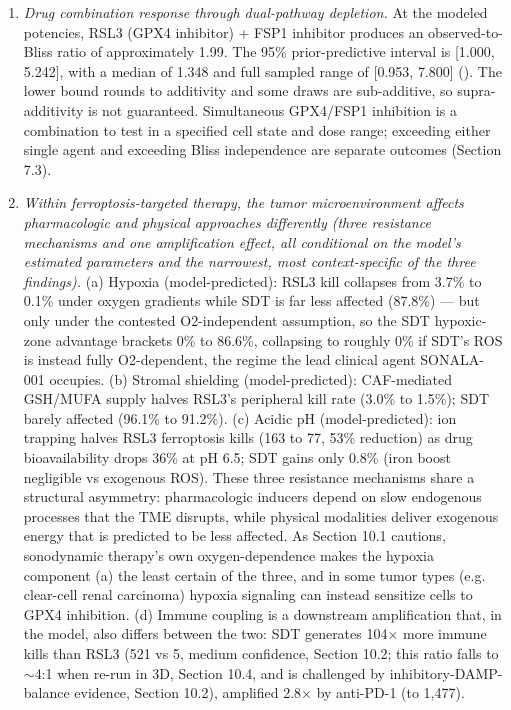 \documentclass[11pt,twoside,openright]{report}
\begin{document}
\begin{enumerate}
\item \textit{Drug combination response through dual-pathway depletion.} At the modeled potencies, RSL3 (GPX4 inhibitor) + FSP1 inhibitor produces an observed-to-Bliss ratio of approximately 1.99. The 95\% prior-predictive interval is [1.000, 5.242], with a median of 1.348 and full sampled range of [0.953, 7.800] (). The lower bound rounds to additivity and some draws are sub-additive, so supra-additivity is not guaranteed. Simultaneous GPX4/FSP1 inhibition is a combination to test in a specified cell state and dose range; exceeding either single agent and exceeding Bliss independence are separate outcomes (Section 7.3).
\item \textit{Within ferroptosis-targeted therapy, the tumor microenvironment affects pharmacologic and physical approaches differently (three resistance mechanisms and one amplification effect, all conditional on the model's estimated parameters and the narrowest, most context-specific of the three findings).} (a) Hypoxia (model-predicted): RSL3 kill collapses from 3.7\% to 0.1\% under oxygen gradients while SDT is far less affected (87.8\%) --- but only under the contested O2-independent assumption, so the SDT hypoxic-zone advantage brackets 0\% to 86.6\%, collapsing to roughly 0\% if SDT's ROS is instead fully O2-dependent, the regime the lead clinical agent SONALA-001 occupies. (b) Stromal shielding (model-predicted): CAF-mediated GSH/MUFA supply halves RSL3's peripheral kill rate (3.0\% to 1.5\%); SDT barely affected (96.1\% to 91.2\%). (c) Acidic pH (model-predicted): ion trapping halves RSL3 ferroptosis kills (163 to 77, 53\% reduction) as drug bioavailability drops 36\% at pH 6.5; SDT gains only 0.8\% (iron boost negligible vs exogenous ROS). These three resistance mechanisms share a structural asymmetry: pharmacologic inducers depend on slow endogenous processes that the TME disrupts, while physical modalities deliver exogenous energy that is predicted to be less affected. As Section 10.1 cautions, sonodynamic therapy's own oxygen-dependence makes the hypoxia component (a) the least certain of the three, and in some tumor types (e.g. clear-cell renal carcinoma) hypoxia signaling can instead sensitize cells to GPX4 inhibition. (d) Immune coupling is a downstream amplification that, in the model, also differs between the two: SDT generates 104$\times$ more immune kills than RSL3 (521 vs 5, medium confidence, Section 10.2; this ratio falls to $\sim$4:1 when re-run in 3D, Section 10.4, and is challenged by inhibitory-DAMP-balance evidence, Section 10.2), amplified 2.8$\times$ by anti-PD-1 (to 1,477).

\end{enumerate}
\end{document}
